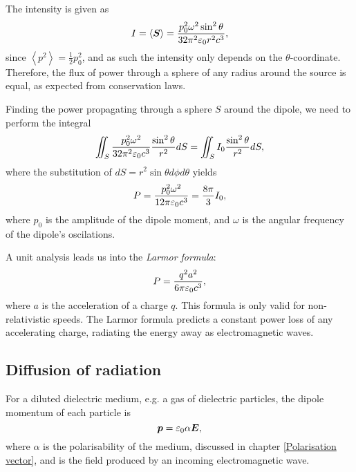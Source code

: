         The intensity is given as 
        \begin{equation}
            I = \left<\bm{S}\right> = \frac{p_0^2\omega^2\sin^2\theta}{32\pi^2\varepsilon_0 r^2 c^3},
        \end{equation}
        since $\left<p^2\right> = \frac{1}{2}p_0^2$, and as such the intensity only depends on the $\theta$-coordinate. 
        Therefore, the flux of power through a sphere of any radius around the source is equal, as expected from conservation laws. 

        Finding the power propagating through a sphere $S$ around the dipole, we need to perform the integral 
        \begin{equation*}
            \iint_S \frac{p_0^2\omega^2}{32\pi^2\varepsilon_0 c^3} \frac{\sin^2\theta}{r^2} dS = \iint_S I_0\frac{\sin^2\theta}{r^2} dS,
        \end{equation*}
        where the substitution of $dS = r^2\sin\theta d\phi d\theta$ yields 
        \begin{equation}
            P = \frac{p_0^2\omega^2}{12\pi\varepsilon_0 c^3} = \frac{8\pi}{3}I_0,
        \end{equation}
        where $p_0$ is the amplitude of the dipole moment, and $\omega$ is the angular frequency of the dipole's oscilations.

        A unit analysis leads us into the \textit{Larmor formula}:
        \begin{equation}
            P = \frac{q^2a^2}{6\pi\varepsilon_0 c^3},
        \end{equation}
        where $a$ is the acceleration of a charge $q$. This formula is only valid for non-relativistic speeds. 
        The Larmor formula predicts a constant power loss of any accelerating charge, radiating the energy away as electromagnetic waves.

\subsection{Diffusion of radiation}

    For a diluted dielectric medium, e.g. a gas of dielectric particles, the dipole momentum of each particle is 
    \begin{equation}
        \bm{p} = \varepsilon_0\alpha\bm{E},
    \end{equation}
    where $\alpha$ is the polarisability of the medium, discussed in chapter \ref{Polarisation vector}, 
    and \E{} is the field produced by an incoming electromagnetic wave. 

